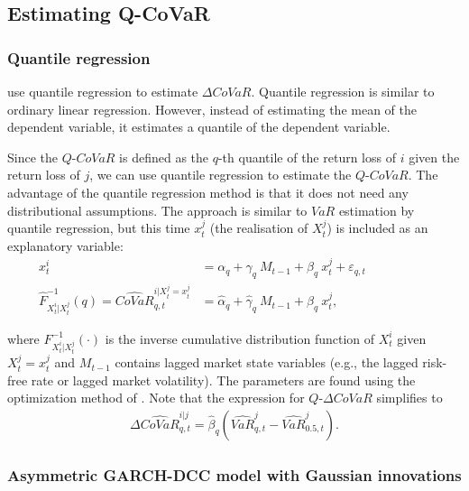 \documentclass[12pt]{article}
\begin{document}
\subsection{Estimating Q-CoVaR} \label{qqcovest}


\subsubsection{Quantile regression} \label{quantilerg}

\citet{adrian} use quantile regression to estimate $\Delta CoVaR$. Quantile regression is similar to ordinary linear regression. However, instead of estimating the mean of the dependent variable, it estimates a quantile of the dependent variable.

Since the $Q$-$CoVaR$ is defined as the $q$-th quantile of the return loss of $i$ given the return loss of $j$, we can use quantile regression to estimate the $Q$-$CoVaR$. The advantage of the quantile regression method is that it does not need any distributional assumptions. The approach is similar to $VaR$ estimation by quantile regression, but this time $x^j_t$ (the realisation of $X^j_t$) is included as an explanatory variable:
\begin{align}
x^i_t & =\alpha_q+ \gamma_q\ M_{t-1} + \beta_q\ x^j_t  + \varepsilon_{q,t} \label{eqcovq32} \ \ \ \ \ \ \ \ \ \ \ \ \ \ \ \ \ \ \ \ \ \ \    \\
\widehat{F}^{-1}_{X^i_t|X^j_t}\left(q\right)  = \widehat{CoVaR}^{i|X^{j}_t = x^j_t}_{q,t} & = \hat{\alpha}_q+ \hat{\gamma}_q\ M_{t-1} + \hat{\beta}_q\ x^j_t ,  \ \ \ \ \ \ \ \ \ \ \ \ \ \ \ \ \ \ \ \ \ \ \  \label{eqcovq3}
\end{align}

\noindent where $F^{-1}_{X^i_t|X^j_t}\left(\cdot\right)$ is the inverse cumulative distribution function of $X^i_t$ given $X^j_t= x^j_t$ and $M_{t-1}$ contains lagged market state variables (e.g., the lagged risk-free rate or lagged market volatility). The parameters are found using the optimization method of \citet{koenker}. Note that the expression for $Q$-$\Delta CoVaR$ simplifies to
\begin{align}
\Delta\widehat{CoVaR}^{i|j}_{q,t}=\hat{\beta}_q \left(\widehat{VaR}^j_{q,t} - \widehat{VaR}^j_{0.5,t}\right) .
\end{align}


\subsubsection{Asymmetric GARCH-DCC model with Gaussian innovations}  \label{asdcc}
\end{document}
